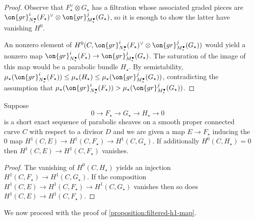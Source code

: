 \begin{proof}
Observe that $F_\star^\vee \otimes G_\star$ has a filtration whose associated graded pieces are
	$\on{gr}_{N_\star^\bullet}^i(F_\star)^\vee \otimes
	\on{gr}_{M_\star^\bullet}^j(G_\star)$,
	so it is enough to show the latter have vanishing $H^0$.

	An nonzero element of $H^0(C, \on{gr}_{N_\star^\bullet}^i(F_\star)^\vee \otimes
\on{gr}_{M_\star^\bullet}^j(G_\star))$ would yield a nonzero map
	$\on{gr}_{N_\star^\bullet}^i(F_\star) \to
	\on{gr}_{M_\star^\bullet}^j(G_\star)$.
	The saturation of the image of this map would be a parabolic bundle
$H_\star$. By semistability, $\mu_\star(\on{gr}_{N_\star^\bullet}^i(F_\star)) \leq
\mu_\star(H_\star) \leq \mu_\star(\on{gr}_{M_\star^\bullet}^j(G_\star))$,
	contradicting the assumption that
	$\mu_\star(\on{gr}_{N_\star^\bullet}^i(F_\star)) >
	\mu_\star(\on{gr}_{M_\star^\bullet}^j(G_\star))$.
\end{proof}
\begin{lemma}
\notready
	\label{lemma:h1-injection}
	Suppose $$0\to F_\star \to G_\star \to H_\star\to 0$$ is a short exact sequence of
	parabolic sheaves on a smooth proper connected curve $C$ with respect to a divisor
	$D$ and we are given a map $E \to F_\star$
	inducing the $0$ map $H^1(C, E) \to H^1(C, F_\star) \to H^1(C,
	G_\star)$.
	If additionally $H^0(C, H_\star) = 0$ then $H^1(C, E) \to H^1(C,F_\star)$ vanishes.
\end{lemma}
\begin{proof}
	The vanishing of $H^0(C, H_\star)$ yields an injection $H^1(C, F_\star)
	\to H^1(C, G_\star)$. If the composition $H^1(C, E) \to H^1(C, F_\star)
	\to H^1(C, G_\star)$ vanishes then so does $H^1(C, E) \to H^1(C,
	F_\star)$.
\end{proof}

We now proceed with the proof of \autoref{proposition:filtered-h1-map}.


